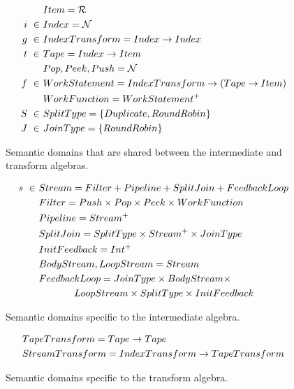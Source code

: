 \begin{figure}[t]
\scriptsize
\begin{align*}
&Item = \mathcal{R} \\
i~\in~&Index = \mathcal{N} \\
g~\in~&IndexTransform = Index \rightarrow Index \\
t~\in~&Tape = Index \rightarrow Item \\
&Pop, Peek, Push = \mathcal{N} \\ 
f~\in~&WorkStatement = IndexTransform \rightarrow (Tape \rightarrow Item) \\ 
&WorkFunction = WorkStatement^{+} \\
S~\in~&SplitType = \{Duplicate, RoundRobin\} \\ 
J~\in~&JoinType = \{RoundRobin\}
\end{align*}
\vspace{-18pt}
\caption{Semantic domains that are shared between the intermediate and
  transform algebras.
\protect\label{fig:shareddom}}
\vspace{3pt}
\begin{align*}
s~\in~&Stream = Filter + Pipeline + SplitJoin + FeedbackLoop \\
&Filter = Push \times Pop \times Peek \times WorkFunction \\
&Pipeline = Stream^{+} \\
&SplitJoin = SplitType \times Stream^{+} \times JoinType \\
&InitFeedback = Int^{+} \\
&BodyStream, LoopStream = Stream \\
&FeedbackLoop = JoinType \times BodyStream \times \\
& \hspace{0.5in} LoopStream \times SplitType \times InitFeedback
\end{align*}
\vspace{-18pt}
\caption{Semantic domains specific to the intermediate algebra.
\protect\label{fig:interdom}}
\vspace{3pt}
\begin{align*}
&TapeTransform = Tape \rightarrow Tape \\
&StreamTransform =  IndexTransform \rightarrow TapeTransform
\end{align*}
\vspace{-18pt}
\caption{Semantic domains specific to the transform algebra.
\protect\label{fig:transformdom}}
\vspace{-12pt}
\end{figure}

